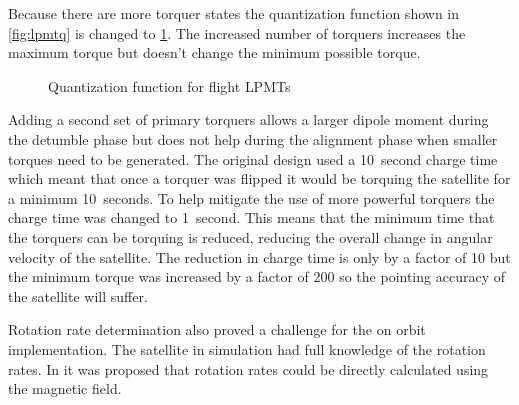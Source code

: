 Because there are more torquer states the quantization function shown in \cref{fig:lpmtq} is changed to \cref{fig:lpmtq-flt}. The increased number of torquers increases the maximum torque but doesn't change the minimum possible torque.

\begin{figure}[htb!]
    \centering
    \caption{Quantization function for flight \acsp{LPMT}}
    \label{fig:lpmtq-flt}
\end{figure}

Adding a second set of primary torquers allows a larger dipole moment during the detumble phase but does not help during the alignment phase when smaller torques need to be generated. The original design used a 10~second charge time which meant that once a torquer was flipped it would be torquing the satellite for a minimum 10~seconds. To help mitigate the use of more powerful torquers the charge time was changed to 1~second. This means that the minimum time that the torquers can be torquing is reduced, reducing the overall change in angular velocity of the satellite. The reduction in charge time is only by a factor of 10 but the minimum torque was increased by a factor of 200 so the pointing accuracy of the satellite will suffer.

Rotation rate determination also proved a challenge for the on orbit implementation. The satellite in simulation had full knowledge of the rotation rates. In \cite{Mentch11} it was proposed that rotation rates could be directly calculated using the magnetic field. 

